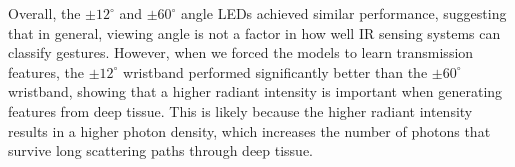 \documentclass[ oneside,%
                    author={Jack Jarvis},
                    degree={BSc},
                     title={FlexIR: Flexible PCB Wristbands for Infrared Based Gesture Recognition},
                    unit={COMS30045},
                    subtitle={Investigating the Effect of LED Viewing Angle on Gesture Classification in Infrared Sensing Systems}]{dissertation}
\begin{document}


Overall, the $\pm 12^\circ$ and $\pm 60^\circ$ angle LEDs achieved similar performance, suggesting that in general, viewing angle is not a factor in how well IR sensing systems can classify gestures. However, when we forced the models to learn transmission features, the $\pm 12^\circ$ wristband performed significantly better than the $\pm 60^\circ$ wristband, showing that a higher radiant intensity is important when generating features from deep tissue. This is likely because the higher radiant intensity results in a higher photon density, which increases the number of photons that survive long scattering paths through deep tissue.
\end{document}
